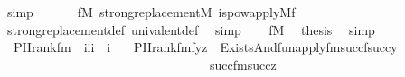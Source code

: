 \begin{isabellebody}
\ simp\isanewline
\ \ \isamarkupfalse%
\isanewline
\ \ \isamarkupfalse%
\ {\isachardoublequoteopen}{\isasymforall}f{}{\isasymin}M{\isachardot}{\kern0pt}\ strong{\isacharunderscore}{\kern0pt}replacement{\isacharparenleft}{\kern0pt}{\isacharhash}{\kern0pt}{\isacharhash}{\kern0pt}M{\isacharcomma}{\kern0pt}\ is{\isacharunderscore}{\kern0pt}powapply{\isacharparenleft}{\kern0pt}{\isacharhash}{\kern0pt}{\isacharhash}{\kern0pt}M{\isacharcomma}{\kern0pt}f{}{\isacharparenright}{\kern0pt}{\isacharparenright}{\kern0pt}{\isachardoublequoteclose}\isanewline
\ \ \ \ \isamarkupfalse%
\ strong{\isacharunderscore}{\kern0pt}replacement{\isacharunderscore}{\kern0pt}def\ univalent{\isacharunderscore}{\kern0pt}def\ \isamarkupfalse%
\ simp\isanewline
\ \ \isamarkupfalse%
\ {\isacartoucheopen}f{\isasymin}M{\isacartoucheclose}\ \isamarkupfalse%
\ {\isacharquery}{\kern0pt}thesis\ \isamarkupfalse%
\ simp\isanewline
{}\isamarkupfalse%
%
\endisatagproof
{\isafoldproof}%
%
\isadelimproof
\isanewline
%
\endisadelimproof
\isanewline
\isanewline
\isanewline
{}\isamarkupfalse%
\isanewline
\ \ PHrank{\isacharunderscore}{\kern0pt}fm\ {\isacharcolon}{\kern0pt}{\isacharcolon}{\kern0pt}\ {\isachardoublequoteopen}{\isacharbrackleft}{\kern0pt}i{\isacharcomma}{\kern0pt}i{\isacharcomma}{\kern0pt}i{\isacharbrackright}{\kern0pt}\ {\isasymRightarrow}\ i{\isachardoublequoteclose}\ \isanewline
\ \ {\isachardoublequoteopen}PHrank{\isacharunderscore}{\kern0pt}fm{\isacharparenleft}{\kern0pt}f{\isacharcomma}{\kern0pt}y{\isacharcomma}{\kern0pt}z{\isacharparenright}{\kern0pt}\ {\isasymequiv}\ Exists{\isacharparenleft}{\kern0pt}And{\isacharparenleft}{\kern0pt}fun{\isacharunderscore}{\kern0pt}apply{\isacharunderscore}{\kern0pt}fm{\isacharparenleft}{\kern0pt}succ{\isacharparenleft}{\kern0pt}f{\isacharparenright}{\kern0pt}{\isacharcomma}{\kern0pt}succ{\isacharparenleft}{\kern0pt}y{\isacharparenright}{\kern0pt}{\isacharcomma}{\kern0pt}{}{\isacharparenright}{\kern0pt}\isanewline
\ \ \ \ \ \ \ \ \ \ \ \ \ \ \ \ \ \ \ \ \ \ \ \ \ \ \ \ \ \ \ \ \ {\isacharcomma}{\kern0pt}succ{\isacharunderscore}{\kern0pt}fm{\isacharparenleft}{\kern0pt}{}{\isacharcomma}{\kern0pt}succ{\isacharparenleft}{\kern0pt}z{\isacharparenright}{\kern0pt}{\isacharparenright}{\kern0pt}{\isacharparenright}{\kern0pt}{\isacharparenright}{\kern0pt}{\isachardoublequoteclose}\isanewline
\isanewline
{}\isamarkupfalse%

\end{isabellebody}
